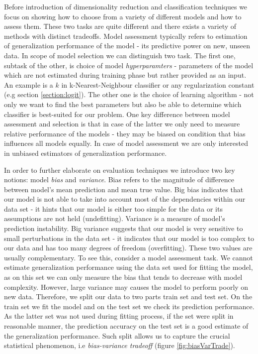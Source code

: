 \documentclass[12pt, wide]{mwart}
\begin{document}
Before introduction of dimensionality reduction and classification techniques we focus on showing how to choose from a variety of different models and how to assess them. These two tasks are quite different and there exists a variety of methods with distinct tradeoffs. Model assessment typically refers to estimation of generalization performance of the model - its predictive power on new, unseen data. In scope of model selection we can distinguish two task. The first one, subtask of the other, is choice of model \textit{hyperparamters} - parameters of the model which are not estimated during training phase but rather provided as an input. An example is a $k$ in k-Nearest-Neighbour classifier or any regularization constant (e.g section \ref{section:logit}). The other one is the choice of learning algorithm - not only we want to find the best parameters but also be able to determine which classifier is best-suited for our problem. One key difference between model assessment and selection is that in case of the latter we only need to measure relative performance of the models - they may be biased on condition that bias influences all models equally. In case of model assessment we are only interested in unbiased estimators of generalization performance.

In order to further elaborate on evaluation techniques we introduce two key notions: model \textit{bias} and \textit{variance}. Bias refers to the magnitude of difference between model's mean prediction and mean true value. Big bias indicates that our model is not able to take into account most of the dependencies within our data set - it hints that our model is either too simple for the data or its assumptions are not held (undefitting). Variance is a measure of model's prediction instability. Big variance suggests that our model is very sensitive to small perturbations in the data set - it indicates that our model is too complex to our data and has too many degrees of freedom (overfitting). These two values are usually complementary. To see this, consider a model assessment task. We cannot estimate generalization performance using the data set used for fitting the model, as on this set we can only measure the bias that tends to decrease with model complexity. However, large variance may causes the model to perform poorly on new data. Therefore, we split our data to two parts train set and test set. On the train set we fit the model and on the test set we check its prediction performance. As the latter set was not used during fitting process, if the set were split in reasonable manner, the prediction accuracy on the test set is a good estimate of the generalization performance. Such split allows us to capture the crucial statistical phenomenon, i.e \textit{bias-variance tradeoff} (figure \ref{fig:biasVarTrade}). 
\end{document}

